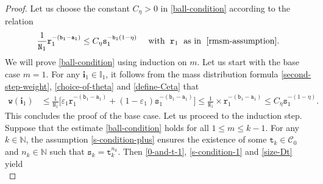 \documentclass[12pt, twoside]{article}
\theoremstyle{definition}
\numberwithin{equation}{section}
\begin{document}
\begin{proof} 
	Let us choose the constant $C_{\eta} > 0$ in \eqref{ball-condition} according to the relation   
	\begin{equation} \label{define-Ceta}
		\frac{1}{\mathtt N_1} \mathtt r_1^{-(\mathtt b_1-\mathtt a_1)} \leq C_{\eta} \mathtt s_1^{-\mathtt b_1(1 - \eta)}
		\quad \text{ with }\; \mathtt r_1 \; \text{ as in }\; \eqref{rmsm-assumption}.
	\end{equation}   
	We will prove \eqref{ball-condition} using induction on $m$. Let us start with the base case $m=1$. For any $\mathbf{i}_1 \in \mathbb I_1$, it follows from the mass distribution formula \eqref{second-step-weight}, \eqref{choice-of-theta} and \eqref{define-Ceta} that 
	\begin{align*} 
		\mathtt w(\mathbf{i}_1) &\leq \frac{1}{\mathtt N_1} \bigl[\varepsilon_1 \mathtt r_1^{-(\mathtt b_1 - \mathtt a_1)} +  (1 - \varepsilon_1) \mathtt s_1^{-(\mathtt b_1 - \mathtt a_1)} \bigr]  \leq \frac{1}{\mathtt N_1} \times \mathtt r_1^{-(\mathtt b_1 - \mathtt a_1)}  \leq C_{\eta} \mathtt s_1^{-(1 - \eta)}.
	\end{align*} 
	This concludes the proof of the base case. Let us proceed to the induction step. Suppose that the estimate \eqref{ball-condition} holds for all $1 \leq m \leq k-1$. For any $k\in\mathbb{N}$, the assumption \eqref{s-condition-plus} ensures the existence of some $\mathtt t_k \in \mathscr{C}_0$ and $n_k \in \mathbb{N}$ such that $\mathtt s_k = \mathtt t_k^{n_k}$. Then \eqref{0-and-t-1}, \eqref{s-condition-1} and \eqref{size-Dt} yield 
	\begin{equation} \label{skrk-induction} 

\end{equation}
\end{proof}
\end{document}
